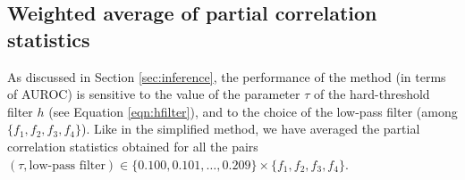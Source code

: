 \documentclass[wcp]{jmlr}
\begin{document}



\subsection{Weighted average of partial correlation statistics}
\label{sapp:averaging}

As discussed in Section \ref{sec:inference}, the performance of the method (in
terms of AUROC) is sensitive to the value of the parameter $\tau$ of the
hard-threshold filter $h$ (see Equation \ref{eqn:hfilter}), and to the choice
of the low-pass filter (among $\{f_1, f_2, f_3, f_4\}$).
Like in the simplified method, we have averaged the partial correlation statistics obtained for all the pairs $(\tau,\mbox{low-pass filter}) \in \{0.100,0.101,\ldots,0.209\}\times \{f_1, f_2, f_3, f_4\}$.
\end{document}

